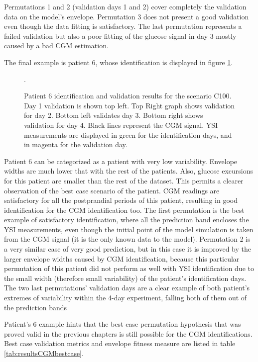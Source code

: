 Permutations 1 and 2 (validation days 1 and 2) cover completely the validation data on the model's envelope. Permutation 3 does not present a good validation even though the data fitting is satisfactory. The last permutation represents a failed validation but also a poor fitting of the glucose signal in day 3 mostly caused by a bad CGM estimation.

The final example is patient 6, whose identification is displayed in figure \ref{fig:CGMpatient6}.

\begin{figure}[hbt]
\centering
{}\caption{Patient 6 identification and validation results for the scenario C100. Day 1 validation is shown top left. Top Right graph shows validation for day 2. Bottom left validates day 3. Bottom right shows validation for day 4. Black lines represent the CGM signal. YSI measurements are displayed in green for the identification days, and in magenta for the validation day.}
\label{fig:CGMpatient6}.
\end{figure}

Patient 6 can be categorized as a patient with very low variability. Envelope widths are much lower that with the rest of the patients. Also, glucose excursions for this patient are smaller than the rest of the dataset. This permits a clearer observation of the best case scenario of the patient. CGM readings are satisfactory for all the postprandial periods of this patient, resulting in good identification for the CGM identification too. The first permutation is the best example of satisfactory identification, where all the prediction band encloses the YSI measurements, even though the initial point of the model simulation is taken from the CGM signal (it is the only known data to the model). Permutation 2 is a very similar case of very good prediction, but in this case it is improved by the larger envelope widths caused by CGM identification, because this particular permutation of this patient did not perform as well with YSI identification due to the small width (therefore small variability) of the patient's identification days. The two last permutations' validation days are a clear example of both patient's extremes of variability within the 4-day experiment, falling both of them out of the prediction bands

Patient's 6 example hints that the best case permutation hypothesis that was proved valid in the previous chapters is still possible for the CGM identifications. Best case validation metrics and envelope fitness measure are listed in table \ref{tab:resultsCGMbestcase}.

